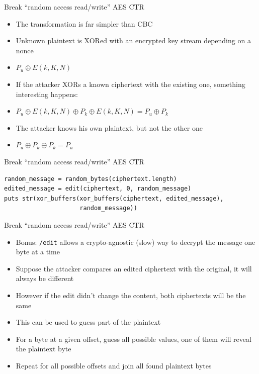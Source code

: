 \documentclass[presentation]{beamer}
\begin{document}
\begin{frame}[label={sec:org972d629}]{Break “random access read/write” AES CTR}
\begin{itemize}
\item The transformation is far simpler than CBC
\item Unknown plaintext is XORed with an encrypted key stream depending on
a nonce
\item \(P_u \oplus E(k, K, N)\)
\item If the attacker XORs a known ciphertext with the existing one,
something interesting happens:
\item \(P_u \oplus E(k, K, N) \oplus P_k \oplus E(k, K, N) = P_u \oplus P_k\)
\item The attacker knows his own plaintext, but not the other one
\item \(P_u \oplus P_k \oplus P_k = P_u\)
\end{itemize}
\end{frame}

\begin{frame}[fragile,label={sec:orge1e2624}]{Break “random access read/write” AES CTR}
 \begin{verbatim}
random_message = random_bytes(ciphertext.length)
edited_message = edit(ciphertext, 0, random_message)
puts str(xor_buffers(xor_buffers(ciphertext, edited_message),
                     random_message))
\end{verbatim}
\end{frame}

\begin{frame}[fragile,label={sec:org3675e85}]{Break “random access read/write” AES CTR}
 \begin{itemize}
\item Bonus: \texttt{/edit} allows a crypto-agnostic (slow) way to
decrypt the message one byte at a time
\item Suppose the attacker compares an edited ciphertext with the
original, it will always be different
\item However if the edit didn't change the content, both ciphertexts will
be the same
\item This can be used to guess part of the plaintext
\item For a byte at a given offset, guess all possible values, one of them
will reveal the plaintext byte
\item Repeat for all possible offsets and join all found plaintext bytes
\end{itemize}
\end{frame}
\end{document}
